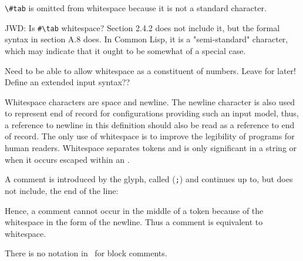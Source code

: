%
\label{comments}
%
\begin{optPrivate}
    \verb+\#tab+ is omitted from whitespace because it is not a standard
    character.

    JWD: Is \verb+#\tab+ whitespace?  Section 2.4.2 does not include it, but the
    formal syntax in section A.8 does.  In Common Lisp, it is a "semi-standard"
    character, which may indicate that it ought to be somewhat of a special
    case.

    Need to be able to allow whitespace as a constituent of numbers.  Leave for
    later!  Define an extended input syntax??
\end{optPrivate}
%
\begin{optDefinition}
Whitespace characters are space and
newline.  The newline character is also used to represent end of record for
configurations providing such an input model, thus, a reference to newline in
this definition should also be read as a reference to end of record.  The only
use of whitespace is to improve the legibility of programs for human readers.
Whitespace separates tokens and is only significant in a string or when it
occurs escaped within an .

A comment is introduced by the 
 glyph, called 
(\verb+;+) and continues up to, but does not include, the end of the line:
%
\Syntax
{}

Hence, a comment cannot occur in the middle of a token because of the whitespace
in the form of the newline.  Thus a comment is equivalent to whitespace.
%
\begin{note}
    There is no notation in \eulisp\ for block comments.
\end{note}
\end{optDefinition}

